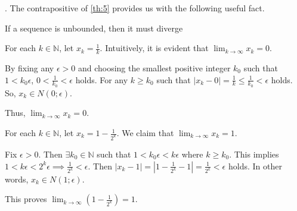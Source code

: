 \documentclass[8pt]{beamer}
\newcommand{\mbb}[1]{\mathbb{#1}}
\newcommand{\abs}[1]{\left\lvert #1 \right\rvert}
\begin{document}
\begin{frame}{.}
    The contrapositive of \ref{th:5} provides us with the following useful fact.
    \begin{theorem}
        If a sequence is unbounded, then it must diverge
    \end{theorem}

    \begin{example}
        For each $k \in \mbb{N}$, let $x_k = \frac{1}{k}$.
        Intuitively, it is evident that $\lim_{k \to \infty} x_k = 0$.

        By fixing any $\epsilon > 0$ and choosing the smallest positive integer $k_0$ such that $1 < k_0 \epsilon$, $0 < \frac{1}{k_0} < \epsilon$ holds.
        For any $k \geq k_0$ such that $\abs{x_k - 0} = \frac{1}{k} \leq \frac{1}{k_0} < \epsilon$ holds.
        So, $x_k \in N(0; \epsilon)$.

        Thus, $\lim_{k \to \infty} x_k = 0$.
    \end{example}

    \begin{example}
        For each $k \in \mbb{N}$, let $x_k = 1 - \frac{1}{2^k}$.
        We claim that $\lim_{k \to \infty} x_k = 1$.

        Fix $\epsilon > 0$.
        Then $\exists k_0 \in \mbb{N}$ such that $1 < k_0\epsilon < k \epsilon$ where $k \geq k_0$.
        This implies $1 < k\epsilon < 2^k \epsilon \implies \frac{1}{2^k} < \epsilon$.
        Then $\abs{x_k - 1} = \abs{1 - \frac{1}{2^k} -1} = \frac{1}{2^k} < \epsilon$ holds.
        In other words, $x_k \in N(1;\epsilon)$.

        This proves $\lim_{k \to \infty} (1 - \frac{1}{2^k}) = 1$.
    \end{example}
\end{frame}
\end{document}
